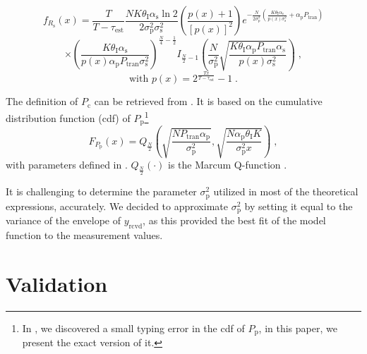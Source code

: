 \begin{equation}
	\label{Rspdf}
	f_{R_\textrm{s}}\left(x\right) =
	\frac{T}{T-\tau_\textrm{est}}\frac{N K \theta_\textrm{I} \alpha_\textrm{s} \ln{2}}{2 \sigma_\textrm{p}^2 \sigma_\textrm{s}^2} 
	\left(\frac{p\left(x\right)+1}{\left[p\left(x\right)\right]^2} \right)
	e^{-\frac{N}{2 \sigma_\textrm{p}^2} \left(\frac{K \theta_\textrm{I} \alpha_\textrm{s}}{p\left(x\right)\sigma_\textrm{s}^2} + \alpha_\textrm{p} P_\textrm{tran} \right)}
\end{equation}
\begin{equation*}
	\times \left(\frac{K \theta_\textrm{I} \alpha_\textrm{s}}{p\left(x\right) \alpha_\textrm{p} P_\textrm{tran}\sigma_\textrm{s}^2}\right)^{\frac{N}{4}-\frac{1}{2}}
	I_{\frac{N}{2}-1}\left(\frac{N}{\sigma_\textrm{p}^2}\sqrt{\frac{K \theta_\textrm{I} \alpha_\textrm{p} P_\textrm{tran} \alpha_\textrm{s}}{p\left(x\right) \sigma_\textrm{s}^2}}\right) \;  ,
\end{equation*}
\begin{equation*}
\text{with } p\left(x\right) = 2^\frac{Tx}{T-\tau_\textrm{est}}-1 \;  .
\end{equation*} 


The definition of $P_\textrm{c}$ can be retrieved from \cite{Kaushik15}. It is based on the cumulative distribution function (cdf) of $P_\textrm{p}$\footnote{In \cite{Kaushik15}, we discovered a small typing error in the cdf of $P_\textrm{p}$, in this paper, we present the exact version of it.}
\begin{equation}
	\label{kumu}
	F_{P_\textrm{p}}\left(x\right) = Q_{\frac{N}{2}}\left(\sqrt{\frac{N P_\textrm{tran} \alpha_\textrm{p}}{\sigma_\textrm{p}^2}},\sqrt{\frac{N \alpha_\textrm{p} \theta_\textrm{I} K}{\sigma_\textrm{p}^2 x}}\right) \;  ,
\end{equation}
with parameters defined in \cite{Kaushik15}. $Q_{\frac{N}{2}}(\cdot)$ is the Marcum Q-function \cite{Jef00}.

It is challenging to determine the parameter $\sigma_\textrm{p}^2$ utilized in most of the theoretical expressions, accurately. We decided to approximate $\sigma_\textrm{p}^2$ by setting it equal to the variance of the envelope of $y_\textrm{rcvd}$, as this provided the best fit of the model function to the measurement values.


\section{Validation}
\label{val}

